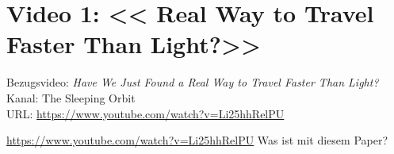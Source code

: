 
\section{Video 1: << Real Way to Travel Faster Than Light?>>}

\begin{videobox}
Bezugsvideo: \emph{Have We Just Found a Real Way to Travel Faster Than Light?} \\
Kanal: The Sleeping Orbit \\
URL: \url{https://www.youtube.com/watch?v=Li25hhRelPU}
\end{videobox}

\begin{userbox}
\url{https://www.youtube.com/watch?v=Li25hhRelPU} \quad Was ist mit diesem Paper?
\end{userbox}

